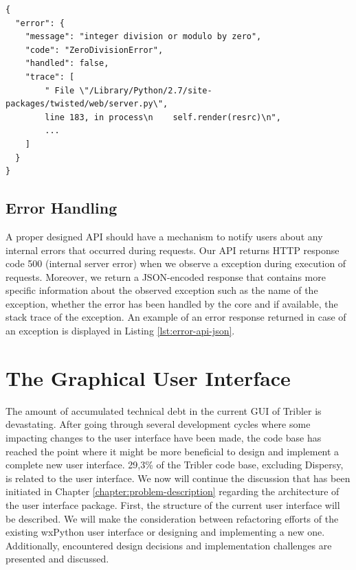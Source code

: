 \begin{lstlisting}[caption={The response in JSON format returned when an exception is observed in Tribler during the processing of an API request.},label={lst:error-api-json}]
{
  "error": {
    "message": "integer division or modulo by zero",
    "code": "ZeroDivisionError",
    "handled": false,
    "trace": [
        " File \"/Library/Python/2.7/site-packages/twisted/web/server.py\", 
        line 183, in process\n    self.render(resrc)\n", 
        ...
    ]
  }
}
\end{lstlisting}

\subsection{Error Handling}
\label{subsec:error-handling-api}
A proper designed API should have a mechanism to notify users about any internal errors that occurred during requests. Our API returns HTTP response code 500 (internal server error) when we observe a exception during execution of requests. Moreover, we return a JSON-encoded response that contains more specific information about the observed exception such as the name of the exception, whether the error has been handled by the core and if available, the stack trace of the exception. An example of an error response returned in case of an exception is displayed in Listing \ref{lst:error-api-json}.

\section{The Graphical User Interface}
The amount of accumulated technical debt in the current GUI of Tribler is devastating. After going through several development cycles where some impacting changes to the user interface have been made, the code base has reached the point where it might be more beneficial to design and implement a complete new user interface. 29,3\% of the Tribler code base, excluding Dispersy, is related to the user interface. We now will continue the discussion that has been initiated in Chapter \ref{chapter:problem-description} regarding the architecture of the user interface package. First, the structure of the current user interface will be described. We will make the consideration between refactoring efforts of the existing wxPython user interface or designing and implementing a new one. Additionally, encountered design decisions and implementation challenges are presented and discussed.

